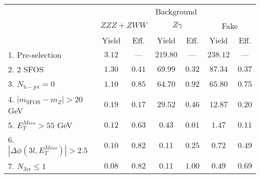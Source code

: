 \begin{tabular}{l||c|c||c|c||c|c}
\hline
 &       \multicolumn{6}{c}{Background} \\
 & \multicolumn{2}{c||}{$ZZZ+ZWW$} & \multicolumn{2}{c||}{$Z\gamma$} & \multicolumn{2}{c}{Fake} \\ 
 & Yield & Eff. & Yield & Eff. & Yield & Eff. \\
\hline\hline
1. Pre-selection & $3.12$ & --- &  $219.80$ & --- &  $238.12$ & ---  \\ 
\hline
2. 2 SFOS &  $1.30$ &  $0.41$ &  $69.99$ &  $0.32$ &  $87.34$ &  $0.37$ \\ 
\hline
3. $N_{\mathrm{b-jet}}=0$ &  $1.10$ &  $0.85$ &  $64.70$ &  $0.92$ &  $65.80$ &  $0.75$ \\ 
\hline
4. $| m_{\mathrm{SFOS}} - m_Z | >  20$ GeV &  $0.19$ &  $0.17$ &  $29.52$ &  $0.46$ &  $12.87$ &  $0.20$ \\ 
\hline
5. $E_{T}^{Miss} > 55$ GeV &  $0.12$ &  $0.63$ &  $0.43$ &  $0.01$ &  $1.47$ &  $0.11$ \\ 
\hline
6. $|\Delta\phi(3l,E_{T}^{Miss})| > 2.5$ &  $0.10$ &  $0.82$ &  $0.11$ &  $0.25$ &  $0.72$ &  $0.49$ \\ 
\hline
7. $N_{\mathrm{Jet}} \leq 1$ &  $0.08$ &  $0.82$ &  $0.11$ &  $1.00$ &  $0.49$ &  $0.69$ \\ 
\hline
\end{tabular}

